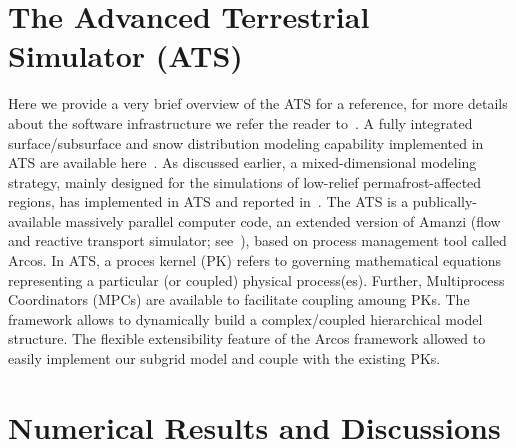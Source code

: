 \documentclass[review,11pt]{elsarticle}
\begin{document}
\section{The Advanced Terrestrial Simulator (ATS)}\label{ATS}
Here we provide a very brief overview of the ATS for a reference, for more details about the software infrastructure we refer the reader to~\cite{ecoon2016managing, ats-website}. A fully integrated surface/subsurface and snow distribution modeling capability implemented in ATS are available here~\cite{spainter2016integrated, atchley2015}. As discussed earlier, a mixed-dimensional modeling strategy, mainly designed for the simulations of low-relief permafrost-affected regions, has implemented in ATS and reported in~\cite{jan2017}. The ATS is a publically-available massively parallel computer code, an extended version of Amanzi (flow and reactive transport simulator; see~\cite{moulton2012high}), based on process management tool called Arcos. In ATS, a proces kernel (PK) refers to governing mathematical equations representing a particular (or coupled) physical process(es). Further, Multiprocess Coordinators (MPCs) are available to facilitate coupling amoung PKs. The framework allows to dynamically build a complex/coupled hierarchical model structure. The flexible extensibility feature of the Arcos framework allowed to easily implement our subgrid model and couple with the existing PKs.

\section{Numerical Results and Discussions}\label{numerical-tests}
\FloatBarrier
\end{document}
